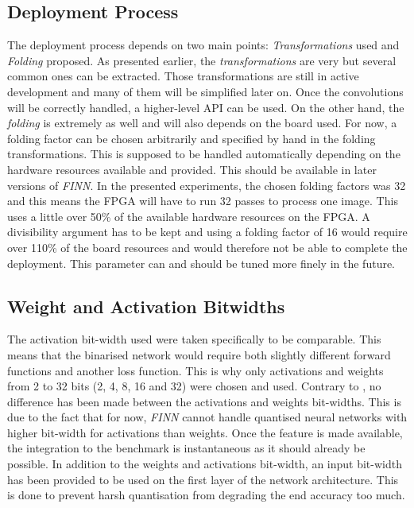 
\subsection{Deployment Process}

The deployment process depends on two main points: \emph{Transformations} used and \emph{Folding} proposed. As presented earlier, the \emph{transformations} are very  but several common ones can be extracted. Those transformations are still in active development and many of them will be simplified later on. Once the convolutions will be correctly handled, a higher-level API can be used. On the other hand, the \emph{folding} is extremely  as well and will also depends on the board used. For now, a folding factor can be chosen arbitrarily and specified by hand in the folding transformations. This is supposed to be handled automatically depending on the hardware resources available and provided. This should be available in later versions of \emph{FINN}. In the presented experiments, the chosen folding factors was 32 and this means the FPGA will have to run 32 passes to process one image. This uses a little over 50\% of the available hardware resources on the FPGA. A divisibility argument has to be kept and using a folding factor of 16 would require over 110\% of the board resources and would therefore not be able to complete the deployment. This parameter can and should be tuned more finely in the future.


\subsection{Weight and Activation Bitwidths}

The activation bit-width used were taken specifically to be comparable. This means that the binarised network would require both slightly different forward functions and another loss function. This is why only activations and weights from 2 to 32 bits (2, 4, 8, 16 and 32) were chosen and used. Contrary to \cite{Bacchus2020}, no difference has been made between the activations and weights bit-widths. This is due to the fact that for now, \emph{FINN} cannot handle quantised neural networks with higher bit-width for activations than weights. Once the feature is made available, the integration to the benchmark is instantaneous as it should already be possible. In addition to the weights and activations bit-width, an input bit-width has been provided to be used on the first layer of the network architecture. This is done to prevent harsh quantisation from degrading the end accuracy too much.

